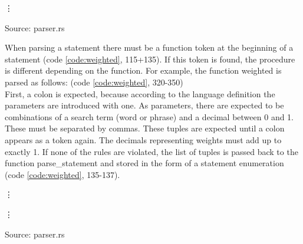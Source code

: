 \begin{codeenv}
    \label{code:read}
    
    \vdots
    
    \centerline{Source: parser.rs}
\end{codeenv}
When parsing a statement there must be a function token at the beginning of a statement (code \ref{code:weighted}, 115+135). If this token is found, the procedure is different depending on the function. For example, the function weighted is parsed as follows: (code \ref{code:weighted}, 320-350)\\
First, a colon is expected, because according to the language definition the parameters are introduced with one. As parameters, there are expected to be combinations of a search term (word or phrase) and a decimal between 0 and 1. These must be separated by commas. These tuples are expected until a colon appears as a token again. The decimals representing weights must add up to exactly 1. If none of the rules are violated, the list of tuples is passed back to the function parse\_statement and stored in the form of a statement enumeration (code \ref{code:weighted}, 135-137).
\begin{codeenv}
    \label{code:weighted}
    
    \vdots
    
    \vdots
    
    \centerline{Source: parser.rs}
\end{codeenv}
